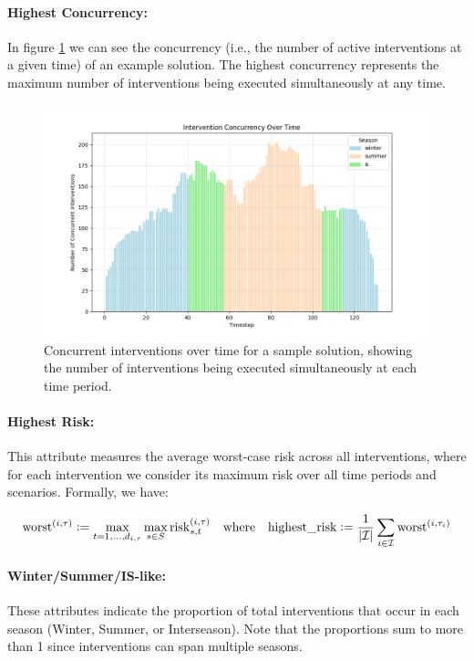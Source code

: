 \paragraph{Highest Concurrency:} In figure \ref{fig:concurrency} we can see the concurrency (i.e., the number of active interventions at a given time) of an example solution. The highest concurrency represents the maximum number of interventions being executed simultaneously at any time. 

\begin{figure}[ht]
    \centering
    \includegraphics[width=\textwidth]{ch3/figures/Concurrency.png}
    \caption{Concurrent interventions over time for a sample solution, showing the number of interventions being executed simultaneously at each time period.}
    \label{fig:concurrency}
\end{figure}



\paragraph{Highest Risk:} This attribute measures the average worst-case risk across all interventions, where for each intervention we consider its maximum risk over all time periods and scenarios. Formally, we have:

\[\operatorname{worst}^{(i,\tau)} \mathrel{\mathop:}= \max_{t=1,\dots,d_{i,\tau}} \max_{s\in S} \mathrm{risk}_{s,t}^{(i,\tau)} \quad \text{where} \quad \text{highest\_risk} \mathrel{\mathop:}= \frac{1}{|\mathcal{I}|}\sum_{i\in\mathcal{I}} \operatorname{worst}^{(i,\tau_i)}\]



\paragraph{Winter/Summer/IS-like:} These attributes indicate the proportion of total interventions that occur in each season (Winter, Summer, or Interseason). Note that the proportions sum to more than 1 since interventions can span multiple seasons.